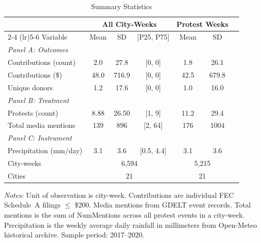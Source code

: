\begin{table}[t]
\centering
\caption{Summary Statistics}
\label{tab:summary}
\begin{tabular}{lcccccc}
\toprule
& \multicolumn{3}{c}{All City-Weeks} & \multicolumn{2}{c}{Protest Weeks} \\
\cmidrule(lr){2-4} \cmidrule(lr){5-6}
Variable & Mean & SD & [P25, P75] & Mean & SD \\
\midrule
\emph{Panel A: Outcomes} \\[3pt]
Contributions (count) & 2.0 & 27.8 & [0, 0] & 1.8 & 26.1 \\
Contributions (\$) & 48.0 & 716.9 & [0, 0] & 42.5 & 679.8 \\
Unique donors & 1.2 & 17.6 & [0, 0] & 1.0 & 16.0 \\[6pt]
\emph{Panel B: Treatment} \\[3pt]
Protests (count) & 8.88 & 26.50 & [1, 9] & 11.2 & 29.4 \\
Total media mentions & 139 & 896 & [2, 64] & 176 & 1004 \\[6pt]
\emph{Panel C: Instrument} \\[3pt]
Precipitation (mm/day) & 3.1 & 3.6 & [0.5, 4.4] & 3.1 & 3.6 \\
\midrule
City-weeks & \multicolumn{3}{c}{6,594} & \multicolumn{2}{c}{5,215} \\
Cities & \multicolumn{3}{c}{21} & \multicolumn{2}{c}{21} \\
\bottomrule
\end{tabular}
\begin{tablenotes}[flushleft]
\footnotesize
\item \textit{Notes:} Unit of observation is city-week. Contributions are individual FEC Schedule~A filings $\leq$ \$200. Media mentions from GDELT event records. Total mentions is the sum of NumMentions across all protest events in a city-week. Precipitation is the weekly average daily rainfall in millimeters from Open-Meteo historical archive. Sample period: 2017--2020.
\end{tablenotes}
\end{table}
